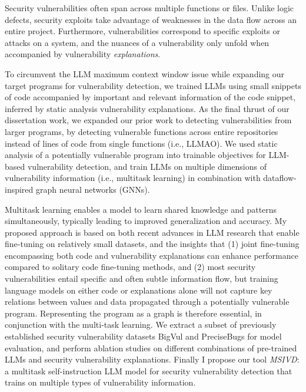 \documentclass[12pt,openany,oneside,table]{cmuthesis}
\begin{document}
Security vulnerabilities often span across multiple functions or files. Unlike logic defects, security exploits take advantage of weaknesses in the data flow across an entire project. Furthermore, vulnerabilities correspond to specific exploits or attacks on a system, and the nuances of a vulnerability only unfold when accompanied by vulnerability \textit{explanations}.

To circumvent the LLM maximum context window issue while expanding our target programs for vulnerability detection, we trained LLMs using small snippets of code accompanied by important and relevant information of the code snippet, inferred by static analysis vulnerability explanations. As the final thrust of our dissertation work, we expanded our prior work to detecting vulnerabilities from larger programs, by detecting vulnerable functions across entire repositories instead of lines of code from single functions (i.e., LLMAO). We used static analysis of a potentially vulnerable program into trainable objectives for LLM-based vulnerability detection, and train LLMs on multiple dimensions of vulnerability information (i.e., multitask learning) in combination with dataflow-inspired graph neural networks (GNNs). 

Multitask learning enables a model to learn shared knowledge and patterns simultaneously, typically leading to improved generalization and accuracy.
My proposed approach is based on both recent advances in LLM research that enable fine-tuning on relatively small datasets, and the insights that (1) joint fine-tuning encompassing both code and vulnerability explanations can enhance performance compared to solitary code fine-tuning methods, and (2) most security vulnerabilities entail specific and often subtle information flow, but training language models on either code or explanations alone will not capture key relations between values and data propagated through a potentially vulnerable program. Representing the program as a graph is therefore essential, in conjunction with the multi-task learning. We extract a subset of previously established security vulnerability datasets BigVul and PreciseBugs for model evaluation, and perform ablation studies on different combinations of pre-trained LLMs and security vulnerability explanations.
Finally I propose our tool \textit{MSIVD}: a multitask self-instruction LLM model for security vulnerability detection that trains on multiple types of vulnerability information.
\end{document}
